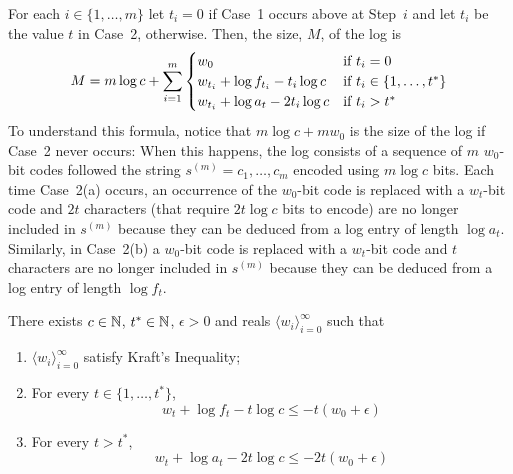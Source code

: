 \documentclass{patmorin}
\begin{document}
For each $i\in\{1,\ldots,m\}$ let $t_i=0$ if Case~1 occurs above at Step~$i$ and let $t_i$ be the value $t$ in Case~2, otherwise.  Then, the size, $M$, of the log is
\begin{equation}
    M = m\log c + \sum_{i=1}^m
        \begin{cases}
           w_0 & \text{if $t_i=0$} \\
           w_{t_i} + \log f_{t_i} - t_i\log c & \text{if $t_i\in\{1,\ldots,t^*\}$} \\
           w_{t_i} + \log a_t - 2t_i\log c & \text{if $t_i>t^*$}          \end{cases} \eqlabel{logsize}
\end{equation}
To understand this formula, notice that $m\log c + mw_0$ is the size of the log if Case~2 never occurs: When this happens, the log consists of a sequence of $m$ $w_0$-bit codes followed the string $s^{(m)}=c_1,\ldots,c_m$ encoded using $m\log c$ bits.  Each time Case~2(a) occurs, an occurrence of the $w_0$-bit code is replaced with a $w_t$-bit code and $2t$ characters (that require $2t\log c$ bits to encode) are no longer included in $s^{(m)}$ because they can be deduced from a log entry of length $\log a_{t}$.  Similarly, in Case~2(b) a $w_0$-bit code is replaced with a $w_t$-bit code and $t$ characters are no longer included in $s^{(m)}$ because they can be deduced from a log entry of length $\log f_t$.  

\begin{clm}
  There exists $c\in\mathbb{N}$, $t^*\in\mathbb{N}$, $\epsilon >0$ and reals $\langle w_i\rangle_{i=0}^\infty$ such that
  \begin{enumerate}
    \item $\langle w_i\rangle_{i=0}^\infty$ satisfy Kraft's Inequality;
    \item For every $t\in\{1,\ldots,t^*\}$,
    \[ w_t + \log f_{t} -t\log c \le -t(w_0+\epsilon) \]
    \item For every $t>t^*$, 
    \[ w_t + \log a_t -2t\log c \le - 2t(w_0+\epsilon) \]
  \end{enumerate}
\end{clm}
\end{document}
